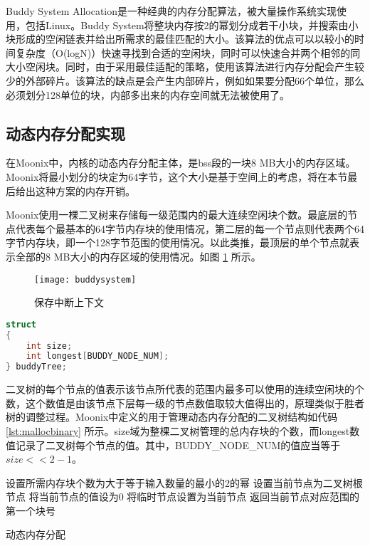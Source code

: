 Buddy System Allocation是一种经典的内存分配算法\cite{DBLP:journals/acta/BrodalDM05}，被大量操作系统实现使用，包括Linux。Buddy System将整块内存按2的幂划分成若干小块，并搜索由小块形成的空闲链表并给出所需求的最佳匹配的大小。该算法的优点可以以较小的时间复杂度（O(logN)）快速寻找到合适的空闲块，同时可以快速合并两个相邻的同大小空闲块。同时，由于采用最佳适配的策略，使用该算法进行内存分配会产生较少的外部碎片。该算法的缺点是会产生内部碎片，例如如果要分配66个单位，那么必须划分128单位的块，内部多出来的内存空间就无法被使用了。

\subsection{动态内存分配实现}

在Moonix中，内核的动态内存分配主体，是bss段的一块8 MB大小的内存区域。Moonix将最小划分的块定为64字节，这个大小是基于空间上的考虑，将在本节最后给出这种方案的内存开销。

Moonix使用一棵二叉树来存储每一级范围内的最大连续空闲块个数。最底层的节点代表每个最基本的64字节内存块的使用情况，第二层的每一个节点则代表两个64字节内存块，即一个128字节范围的使用情况。以此类推，最顶层的单个节点就表示全部的8 MB大小的内存区域的使用情况。如图 \ref{pic:buddysystem} 所示。

\begin{figure}[htpb]
	\centering
	\texttt{[image: buddysystem]}
	\setlength{\abovecaptionskip}{2pt}
	\caption{保存中断上下文}
	\label{pic:buddysystem}
\end{figure}

\begin{lstlisting}[language={C}, caption={动态内存分配管理二叉树}, label={lst:mallocbinary}]
struct
{
	int size;
	int longest[BUDDY_NODE_NUM];
} buddyTree;
\end{lstlisting}

二叉树的每个节点的值表示该节点所代表的范围内最多可以使用的连续空闲块的个数，这个数值是由该节点下层每一级的节点数值取较大值得出的，原理类似于胜者树的调整过程。Moonix中定义的用于管理动态内存分配的二叉树结构如代码 \ref{lst:mallocbinary} 所示。size域为整棵二叉树管理的总内存块的个数，而longest数值记录了二叉树每个节点的值。其中，BUDDY\_NODE\_NUM的值应当等于$size<<2-1$。

\begin{algorithm}[H]
	
	设置所需内存块个数为大于等于输入数量的最小的2的幂\;
	设置当前节点为二叉树根节点\;
	将当前节点的值设为0\;
	将临时节点设置为当前节点\;
	返回当前节点对应范围的第一个块号\;
	\caption{动态内存分配}
	\label{alg:kalloc}
\end{algorithm}


